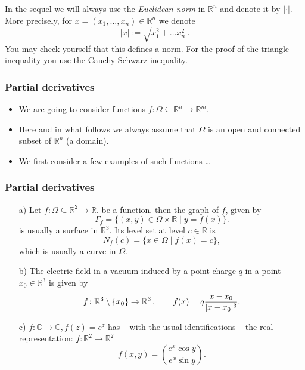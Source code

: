  \begin{frame}[fragile] \frametitle{}
In the sequel we will always use the {\it Euclidean norm } in 
$\mathbb{R}^n$ and denote it by $|\cdot |$. More precisely,
 for $x=(x_1, \dots,x_n) \in \mathbb{R}^n$ we denote
\[
|x|:= \sqrt{x_1^2 + \dots x_n^2}\,.
\]
You may check yourself that this defines a norm. For the proof
of the triangle inequality you use the Cauchy-Schwarz inequality. 

\end{frame}

 \begin{frame}[fragile] \frametitle{Partial derivatives}
 \begin{itemize}
\item We are going to consider functions
$f\colon \Omega \subseteq \mathbb{R}^n \rightarrow \mathbb{R}^m$.
\item Here and in what follows we always assume that 
$\Omega$ is an open and connected  subset of $\mathbb{R}^n$ (a domain).

\item We first consider a few examples of such functions \ldots
\end{itemize}
\end{frame}

 \begin{frame}[fragile] \frametitle{Partial derivatives}




  \begin{itemize}
  \item[a)] Let $f\colon \Omega \subseteq \mathbb{R}^2 \rightarrow \mathbb{R}$.
  be a function. then the graph of $f$, given by
    \[\Gamma_f = \{ (x,y) \in \Omega \times \mathbb{R} \mid y = f(x) \}.\]
    is usually a surface in   $\mathbb{R}^3$. Its level set at level $c\in \mathbb{R}$  is
    \[N_f(c) = \{ x \in \Omega \mid f(x) = c \},\] 
    which is usually a curve in $\Omega$.
  \item[b)] The electric field in a vacuum induced by a point charge $q$ in a point
   $x_0 \in \mathbb{R}^3$  is given by
   \[f\colon \mathbb{R}^3 \setminus \{ x_0 \} \rightarrow \mathbb{R}^3\,,
    \qquad f(x) = q {x - x_0 \over |x - x_0|^3}.\]
  \item[c)] $f\colon \mathbb{C} \rightarrow \mathbb{C}, f(z) = e^z$
    has -- with the usual identifications -- 
    the real representation: $f\colon \mathbb{R}^2 \rightarrow \mathbb{R}^2$
    \[f(x,y) = \binom{e^x \cos y}{e^x \sin y}.\]
  \end{itemize}



\end{frame}

